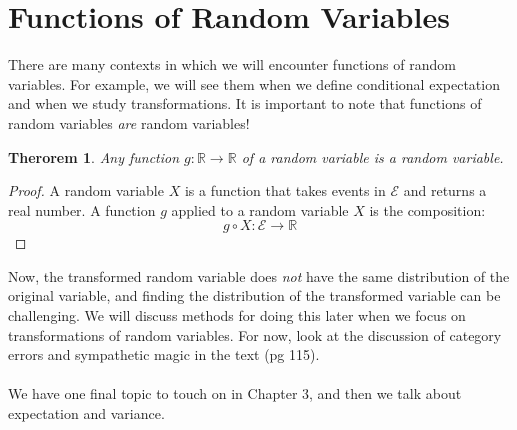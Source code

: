 \documentclass[12pt]{article} %
\newtheorem{thm}{Therorem}
\begin{document}
\section{Functions of Random Variables}
There are many contexts in which we will encounter functions of random variables. For example, we will see them when we define conditional expectation and when we study transformations. It is important to note that functions of random variables \emph{are} random variables!
\begin{thm}
Any function $g:\mathbb{R}\rightarrow\mathbb{R}$ of a random variable is a random variable.
\end{thm}
\begin{proof}
A random variable $X$ is a function that takes events in $\mathcal{E}$ and returns a real number. A function $g$ applied to a random variable $X$ is the composition: 
$$g\circ X:\mathcal{E}\rightarrow \mathbb{R}$$
\end{proof}
Now, the transformed random variable does \emph{not} have the same distribution of the original variable, and finding the distribution of the transformed variable can be challenging. We will discuss methods for doing this later when we focus on transformations of random variables. For now, look at the discussion of category errors and sympathetic magic in the text (pg 115).\\\\
We have one final topic to touch on in Chapter 3, and then we talk about expectation and variance.
\end{document}

